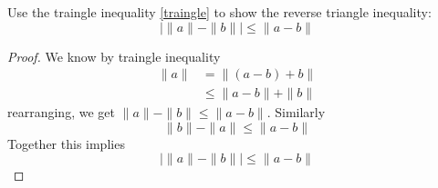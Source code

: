\documentclass[openany]{book}
\begin{document}
\begin{prob}
    Use the traingle inequality \ref{traingle} to show the reverse triangle inequality:
    \begin{equation*}
        \bigg|\|a\|-\|b\|\bigg|\leq\|a-b\|
    \end{equation*}
\end{prob}
\begin{proof}
    We know by traingle inequality 
    \begin{align*}
        \|a\|&=\|(a-b)+b\|\\
        &\leq \|a-b\|+\|b\|
    \end{align*}
    rearranging, we get $\|a\|-\|b\|\leq\|a-b\|$. Similarly 
    \begin{equation*}
        \|b\|-\|a\|\leq \|a-b\|
    \end{equation*}
    Together this implies 
    \begin{equation*}
        \bigg|\|a\|-\|b\|\bigg|\leq\|a-b\|
    \end{equation*}
\end{proof}
\end{document}
